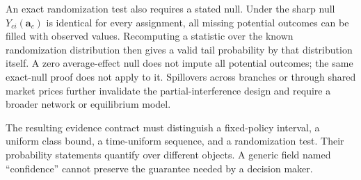 An exact randomization test also requires a stated null. Under the
sharp null $Y_{ci}(\mathbf a_c)$ is identical for every assignment,
all missing potential outcomes can be filled with observed values.
Recomputing a statistic over the known randomization distribution
then gives a valid tail probability by that distribution itself.
A zero average-effect null does not impute all potential outcomes;
the same exact-null proof does not apply to it. Spillovers across
branches or through shared market prices further invalidate the
partial-interference design and require a broader network or
equilibrium model.

The resulting evidence contract must distinguish a fixed-policy
interval, a uniform class bound, a time-uniform sequence, and a
randomization test. Their probability statements quantify over
different objects. A generic field named ``confidence'' cannot
preserve the guarantee needed by a decision maker.
